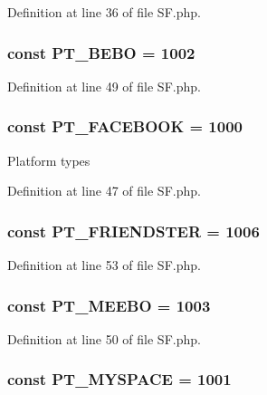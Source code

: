 Definition at line 36 of file SF.php.

\hypertarget{classSF_a44c3e775e3f80d5b3fa3e1d745705126}{
\subsubsection[{PT\_\-BEBO}]{\setlength{\rightskip}{0pt plus 5cm}const {\bf PT\_\-BEBO} = 1002}}
\label{classSF_a44c3e775e3f80d5b3fa3e1d745705126}


Definition at line 49 of file SF.php.

\hypertarget{classSF_a9e8fafa39429831b857bb06424d74dae}{
\subsubsection[{PT\_\-FACEBOOK}]{\setlength{\rightskip}{0pt plus 5cm}const {\bf PT\_\-FACEBOOK} = 1000}}
\label{classSF_a9e8fafa39429831b857bb06424d74dae}
Platform types 

Definition at line 47 of file SF.php.

\hypertarget{classSF_a68ee53bd9120191897b1bbf694e1312c}{
\subsubsection[{PT\_\-FRIENDSTER}]{\setlength{\rightskip}{0pt plus 5cm}const {\bf PT\_\-FRIENDSTER} = 1006}}
\label{classSF_a68ee53bd9120191897b1bbf694e1312c}


Definition at line 53 of file SF.php.

\hypertarget{classSF_a17932752f1340529dfb7ed5daa5c0eb9}{
\subsubsection[{PT\_\-MEEBO}]{\setlength{\rightskip}{0pt plus 5cm}const {\bf PT\_\-MEEBO} = 1003}}
\label{classSF_a17932752f1340529dfb7ed5daa5c0eb9}


Definition at line 50 of file SF.php.

\hypertarget{classSF_a78190e4161de1deb7e2928e801539df5}{
\subsubsection[{PT\_\-MYSPACE}]{\setlength{\rightskip}{0pt plus 5cm}const {\bf PT\_\-MYSPACE} = 1001}}
\label{classSF_a78190e4161de1deb7e2928e801539df5}


